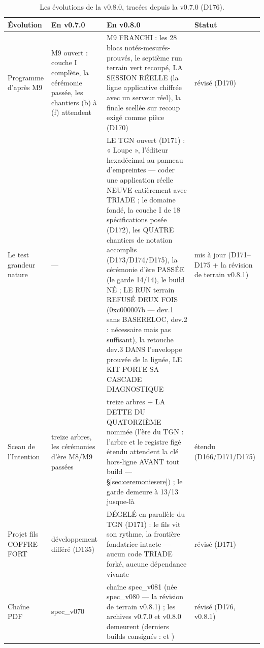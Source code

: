 \begin{table}[htbp]
\centering\small
\caption{Les évolutions de la v0.8.0, tracées depuis la v0.7.0 (D176).}
\label{tab:correspondance080}
\begin{tabularx}{\textwidth}{@{}l Y Y l@{}}
\toprule
\textbf{Évolution} & \textbf{En v0.7.0} & \textbf{En v0.8.0} & \textbf{Statut} \\
\midrule
Programme d'après M9 & M9 ouvert : couche I complète, la cérémonie passée, les
chantiers (b) à (f) attendent & M9 FRANCHI : les 28 blocs notés-mesurés-prouvés,
le septième run terrain vert recoupé, LA SESSION RÉELLE (la ligne applicative
chiffrée avec un serveur réel), la finale  scellée sur recoup exigé
comme pièce (D170) & révisé (D170) \\
Le test grandeur nature & — & LE TGN ouvert (D171) : « Loupe », l'éditeur
hexadécimal au panneau d'empreintes — coder une application réelle NEUVE
entièrement avec TRIADE ; le domaine  fondé, la couche I de 18
spécifications posée (D172), les QUATRE chantiers de notation accomplis
(D173/D174/D175), la cérémonie d'ère PASSÉE (le garde 14/14), le build
 NÉ ; LE RUN terrain REFUSÉ DEUX FOIS (0xc000007b —
dev.1 sans BASERELOC, dev.2 : nécessaire mais pas suffisant), la retouche dev.3
DANS l'enveloppe prouvée de la lignée, LE KIT PORTE SA CASCADE DIAGNOSTIQUE & mis
à jour (D171--D175 + la révision de terrain v0.8.1) \\
Sceau de l'Intention & treize arbres, les cérémonies d'ère M8/M9 passées & treize
arbres + LA DETTE DU QUATORZIÈME nommée (l'ère du TGN : l'arbre  et
le registre figé étendu attendent la clé hors-ligne AVANT tout build —
§\ref{sec:ceremoniesere}) ; le garde demeure à 13/13 jusque-là & étendu
(D166/D171/D175) \\
Projet fils COFFRE-FORT & développement différé (D135) & DÉGELÉ en parallèle du
TGN (D171) : le fils vit son rythme, la frontière fondatrice intacte — aucun code
TRIADE forké, aucune dépendance vivante & révisé (D171) \\
Chaîne PDF & spec\_v070 & chaîne spec\_v081 (née spec\_v080 — la révision de
terrain v0.8.1) ; les archives v0.7.0 et v0.8.0 demeurent (derniers builds
consignés :  et ) & révisé (D176, v0.8.1) \\
\bottomrule
\end{tabularx}
\end{table}

